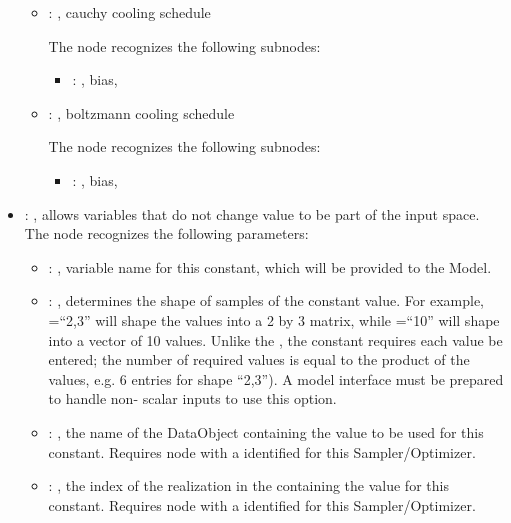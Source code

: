 \begin{itemize}
\begin{itemize}
        \item {}: , 
          cauchy cooling schedule

          The  node recognizes the following subnodes:
          \begin{itemize}
            \item {}: , 
              bias, 
          \end{itemize}

        \item {}: , 
          boltzmann cooling schedule

          The  node recognizes the following subnodes:
          \begin{itemize}
            \item {}: , 
              bias, 
          \end{itemize}
      \end{itemize}

    \item {}: , 
      allows variables that do not change value to be part of the input space.
      The  node recognizes the following parameters:
        \begin{itemize}
          \item {}: , 
            variable name for this constant, which will be provided to the Model.
          \item {}: , 
            determines the shape of samples of the constant value.               For example,
            =``2,3'' will shape the values into a 2 by 3               matrix, while
            =``10'' will shape into a vector of 10 values.               Unlike the
            , the constant requires each value be entered; the number
            of required values is equal to the product of the  values, e.g. 6 entries
            for shape ``2,3'').               \nb A model interface must be prepared to handle non-
            scalar inputs to use this option.
          \item {}: , 
            the name of the DataObject containing the value to be used for this constant.
            Requires  node with a  identified for this
            Sampler/Optimizer.
          \item {}: , 
            the index of the realization in the  
            containing the value for this constant. Requires  node with
            a  identified for this Sampler/Optimizer.
      \end{itemize}


\end{itemize}
